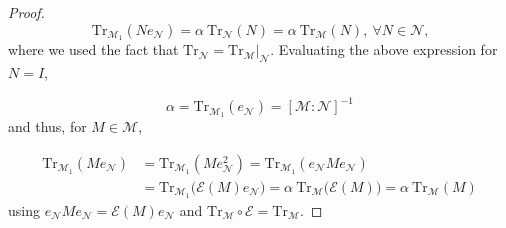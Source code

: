 \documentclass[10pt,a4paper]{amsart}
\begin{document}
\begin{proof}
    \begin{equation}
        \mathrm{Tr}_{\mathcal{M}_1} (N e_{\mathcal{N}}) = \alpha  \ \mathrm{Tr}_{\mathcal{N}}(N) = \alpha  \ \mathrm{Tr}_{\mathcal{M}}(N), \ \forall N \in \mathcal{N} \text{,}
    \end{equation}
    where we used the fact that $\mathrm{Tr}_{\mathcal{N}} = \left. \mathrm{Tr}_{\mathcal{M}} \right|_{\mathcal{N}}$. Evaluating the above expression for $N = I$,

    \begin{equation}
        \alpha = \mathrm{Tr}_{\mathcal{M}_1} (e_{\mathcal{N}}) = [\mathcal{M} : \mathcal{N}]^{-1}
    \end{equation}
    and thus, for $M \in \mathcal{M}$,

    \begin{equation}
        \begin{split}
            \mathrm{Tr}_{\mathcal{M}_1} (M e_{\mathcal{N}}) &= \mathrm{Tr}_{\mathcal{M}_1} (M e_{\mathcal{N}}^2) = \mathrm{Tr}_{\mathcal{M}_1} (e_{\mathcal{N}} M e_{\mathcal{N}}) \\
            &= \mathrm{Tr}_{\mathcal{M}_1} \big( \mathcal{E}(M) e_{\mathcal{N}} \big) = \alpha \ \mathrm{Tr}_{\mathcal{M}} \big( \mathcal{E}(M) \big) = \alpha \ \mathrm{Tr}_{\mathcal{M}}(M)
        \end{split}
    \end{equation}
    using $e_{\mathcal{N}} M e_{\mathcal{N}} = \mathcal{E}(M) e_{\mathcal{N}}$ and $\mathrm{Tr}_{\mathcal{M}} \circ \mathcal{E} = \mathrm{Tr}_{\mathcal{M}}$.
\end{proof}
\end{document}
